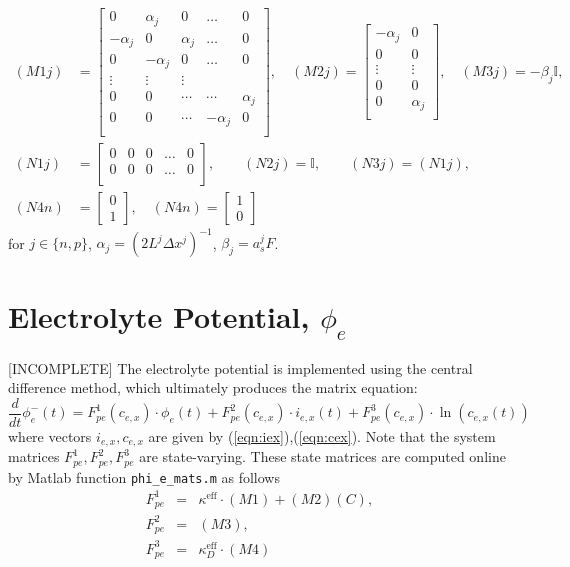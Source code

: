 \documentclass[12pt]{article}
\newcommand{\Id}{{\mathbb{I}}}
\newcommand{\eff}{\text{eff}}
\newcommand{\red}[1]{{\color{red}#1}}
\begin{document}
\begin{align}
(M1j) &=
\left[
\begin{array}{ccccc}
 0 & \alpha_{j} & 0 & \ldots & 0  \\
 -\alpha_{j} & 0 & \alpha_{j} & \ldots & 0  \\
 0 & -\alpha_{j} & 0 & \ldots & 0  \\
 \vdots & \vdots & \vdots &  &  \\
 0 & 0 & \cdots & \cdots & \alpha_{j} \\
 0 & 0 & \cdots & -\alpha_{j} & 0 \\
\end{array}
\right], \quad
(M2j) =
\left[
\begin{array}{cc}
 -\alpha_{j} & 0  \\
 0 & 0 \\
 \vdots & \vdots  \\
 0 & 0 \\
 0 & \alpha_{j} \\
\end{array}
\right], \quad
(M3j) = -\beta_{j} \Id, \\
(N1j) &=
\left[
\begin{array}{ccccc}
 0 & 0 & 0 & \ldots & 0  \\
 0 & 0 & 0 & \ldots & 0  \\
\end{array}
\right], \qquad
(N2j) = \Id, \qquad
(N3j) = (N1j), \quad \\
(N4n) &= 
\left[
\begin{array}{c}
  0 \\
  1
\end{array}
\right], \quad
(N4n) = 
\left[
\begin{array}{c}
  1 \\
  0
\end{array}
\right]
\end{align}
for $j \in \{n,p\}$, $\alpha_{j} = (2 L^{j} \Delta x^{j})^{-1}$, $\beta_{j} = a_{s}^{j} F$.

\section{Electrolyte Potential, $\phi_{e}$}\label{sec:phie}
\red{[INCOMPLETE]} The electrolyte potential is implemented using the central difference method, which ultimately produces the matrix equation:
\begin{equation}
	\frac{d}{dt} \phi_{e}^{-}(t) = F^{1}_{pe}(c_{e,x}) \cdot \phi_{e}(t) + F^{2}_{pe}(c_{e,x}) \cdot i_{e,x}(t) + F^{3}_{pe}(c_{e,x}) \cdot \ln(c_{e,x}(t)) 
\end{equation}
where vectors $i_{e,x}, c_{e,x}$ are given by (\ref{eqn:iex}),(\ref{eqn:cex}). Note that the system matrices $F^{1}_{pe}, F^{2}_{pe}, F^{3}_{pe}$ are state-varying.  These state matrices are computed online by Matlab function \texttt{phi\_e\_mats.m} as follows
\begin{eqnarray}
	F^{1}_{pe} &=& \kappa^{\eff} \cdot (M1) + (M2)(C), \\
	F^{2}_{pe} &=& (M3), \\
	F^{3}_{pe} &=& \kappa^{\eff}_D \cdot (M4)
\end{eqnarray}
\end{document}
